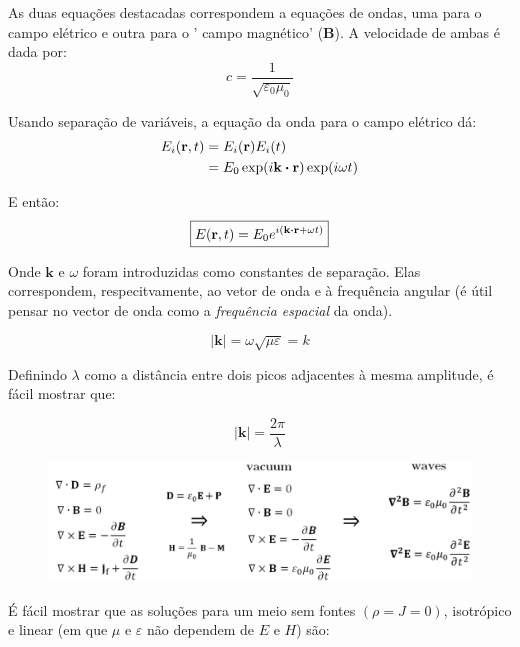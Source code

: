 \documentclass[12pt,a4paper]{report}
\begin{document}
As duas equações destacadas correspondem a equações de ondas, uma para o campo elétrico e outra para o ' campo magnético' (\textbf{B}). A velocidade de ambas é dada por:
\begin{equation}
    c=\frac{1}{\sqrt{\varepsilon_0\mu_0}}
\end{equation}

Usando separação de variáveis, a equação da onda para o campo elétrico dá:
\begin{align*}
    E_i(\textbf{r},t)& = E_i(\textbf{r})E_i(t)\\
                     & = E_0\exp(i\textbf{k}\vdot\textbf{r})\exp(i\omega t)
\end{align*}

E então:
\begin{equation}
    \boxed{E(\textbf{r},t)=E_0e^{i(\textbf{k}\vdot\textbf{r}+\omega t)}}
\end{equation}

Onde $\textbf{k}$ e $\omega$ foram introduzidas como constantes de separação. Elas correspondem, respecitvamente, ao vetor de onda e à frequência angular (é útil pensar no vector de onda como a \textit{frequência espacial} da onda).

\begin{equation}
    |\textbf{k}|=\omega\sqrt{\mu\varepsilon}=k
\end{equation}

Definindo $\lambda$ como a distância entre dois picos adjacentes à mesma amplitude, é fácil mostrar que:

\begin{equation}
    |\textbf{k}|=\frac{2\pi}{\lambda}
\end{equation}

\begin{figure}[H]
    \centering
    \includegraphics[width=1.0\linewidth]{summary.png}
    \caption*{}
\end{figure}

É fácil mostrar que as soluções para um meio sem fontes $(\rho=J=0)$, isotrópico e linear (em que $\mu$ e $\varepsilon$ não dependem de $E$ e $H$) são:
\end{document}
